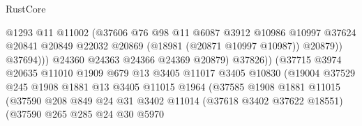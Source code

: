 \begin{lexlean}{RustCore}
\begin{coremodule}
                                        @1293
                                        @11
                                        @11002
                                        (@37606
                                          @76
                                          @98
                                          @11
                                          @6087
                                          @3912
                                          @10986
                                          @10997
                                          @37624
                                          @20841
                                          @20849
                                          @22032
                                          @20869
                                          (@18981 (@20871 @10997 @10987))
                                          @20879))
                                      @37694)))
                                @24360
                                @24363
                                @24366
                                @24369
                                @20879)
                              @37826))
                          (@37715
                            @3974
                            @20635
                            @11010
                            @1909
                            @679
                            @13
                            @3405
                            @11017
                            @3405
                            @10830
                            (@19004
                              @37529
                              @245
                              @1908
                              @1881
                              @13
                              @3405
                              @11015
                              @1964
                              (@37585
                                @1908
                                @1881
                                @11015
                                (@37590
                                  @208
                                  @849
                                  @24
                                  @31
                                  @3402
                                  @11014
                                  (@37618 @3402 @37622 @18551)
                                  (@37590
                                    @265
                                    @285
                                    @24
                                    @30
                                    @5970

\end{coremodule}
\end{lexlean}
